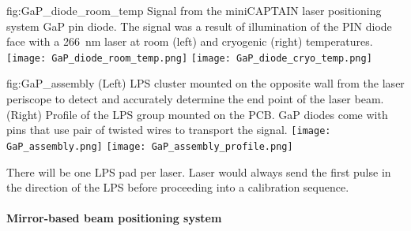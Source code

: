 

\begin{dunefigure}{fig:GaP_diode_room_temp}
{Signal from the miniCAPTAIN laser positioning system GaP pin diode. The signal was a result of illumination of the PIN diode face with a \SI{266}{\nano\m} laser at room (left) and cryogenic (right) temperatures.}
\texttt{[image: GaP\_diode\_room\_temp.png]} 
\texttt{[image: GaP\_diode\_cryo\_temp.png]} 
\end{dunefigure}



\begin{dunefigure}{fig:GaP_assembly}
{(Left) LPS cluster mounted on the opposite wall from the laser periscope to detect and accurately determine the end point of the laser beam. (Right)
Profile of the LPS group mounted on the PCB. GaP diodes come with pins that use pair of twisted wires to transport the signal.
}
\texttt{[image: GaP\_assembly.png]} 
\texttt{[image: GaP\_assembly\_profile.png]} 
\end{dunefigure}


There will be one LPS pad per laser. Laser would always send the first pulse in the direction of the LPS before proceeding into a calibration sequence. 


\paragraph{Mirror-based beam positioning system}


